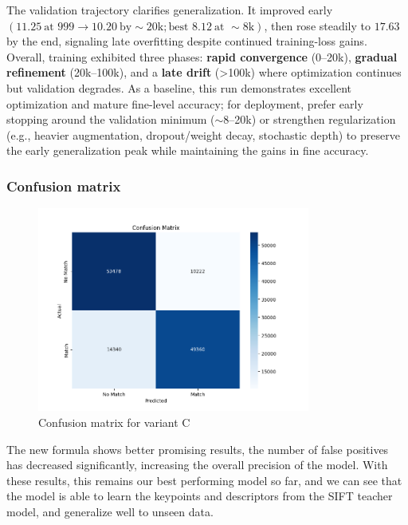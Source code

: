 The validation trajectory clarifies generalization. It improved early
\((\mathbf{11.25}\ \text{at }999 \rightarrow \mathbf{10.20}\ \text{by
}\sim\!20\text{k}; \text{best } \mathbf{8.12}\ \text{at }\sim\!8\text{k})\),
then rose steadily to \(\mathbf{17.63}\) by the end, signaling late overfitting
despite continued training-loss gains. Overall, training exhibited three
phases: \textbf{rapid convergence} (0–20k), \textbf{gradual refinement}
(20k–100k), and a \textbf{late drift} (>100k) where optimization continues but
validation degrades. As a baseline, this run demonstrates excellent
optimization and mature fine-level accuracy; for deployment, prefer early
stopping around the validation minimum (\(\sim\)8–20k) or strengthen
regularization (e.g., heavier augmentation, dropout/weight decay, stochastic
depth) to preserve the early generalization peak while maintaining the gains in
fine accuracy.

\subsubsection{Confusion matrix}
\begin{figure}[H]
    \centering
    \includegraphics[width=0.8\textwidth]{ressources/cm_L_10.png}
    \caption{Confusion matrix for variant C}
    \label{fig:confusion_matrix_4}
\end{figure}
The new formula shows better promising results, the number of false positives has decreased significantly, increasing the overall precision of the model. With these results, this remains our best performing model so far, and we can see that the model is able to learn the keypoints and descriptors from the SIFT teacher model, and generalize well to unseen data.

